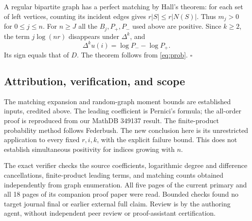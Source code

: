 \documentclass[11pt]{article}
\begin{document}
A regular bipartite graph has a perfect matching by Hall's theorem:
for each set of left vertices, counting its incident edges gives
$r|S|\le r|N(S)|$. Thus $m_j>0$ for $0\le j\le n$. For $n\ge J$
all the $B_j,P_+,P_-$ used above are positive. Since $k\ge2$,
the term $j\log(nr)$ disappears under $\Delta^k$, and
\[
 \Delta^k u(i)=\log P_--\log P_+.
\]
Its sign equals that of $D$. The theorem follows from \eqref{eq:prob}.
\hfill$\square$

\subsection*{Attribution, verification, and scope}
The matching expansion and random-graph moment bounds are established
inputs, credited above. The leading coefficient is Pernici's formula;
the all-order proof is reproduced from our MathDB 349137 result.
The finite-product probability method follows Federbush. The new
conclusion here is its unrestricted application to every fixed
$r,i,k$, with the explicit failure bound. This does not establish
simultaneous positivity for indices growing with $n$.

The exact verifier checks the source coefficients, logarithmic
degree and difference cancellations, finite-product leading terms,
and matching counts obtained independently from graph enumeration.
All five pages of the current primary and all 18 pages of its
companion proof paper were read. Bounded checks found no target
journal final or earlier external full claim. Review is by the
authoring agent, without independent peer review or proof-assistant
certification.
\end{document}
